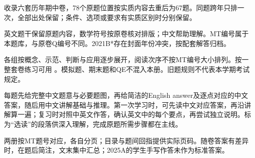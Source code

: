收录六套历年期中卷，78个原题位置按实质内容去重后为67题。同题跨年只排一次，全部出处保留；条件、选项或要求有实质区别时分别保留。


英文题干保留原题内容，数学符号按原卷核对排版；中文帮助理解。MT编号属于本题库，与原卷Q编号不同。2021B*存在封面年份冲突，按配套解答归档。


各组按概念、示范、判断与应用逐步展开，阅读次序不按MT编号大小排列。按一整套卷练习可用 。模拟题、期末题和QE不混入本册。旧题规则不代表本学期考试规定。


每题先给完整中文题意与必要题图，再给简洁的English answer及逐点对应的中文答案，随后用中文讲解基础与推理。第一次学习时，可先读中文对应答案，再沿讲解算一遍；复习时对照中英文作答，确认英文中的每个要点，再尝试独立说明。标为“选读”的段落供深入理解，完成原题所需步骤都在主线。


两册按MT题号对应，各自分页；目录与题间回指提供实际页码。随卷答案有差异时，在题后简注，文末集中汇总；2025A的学生手写作答未作为标准答案。

